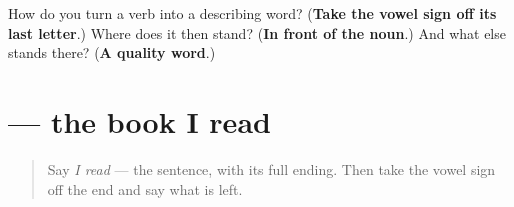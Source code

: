 \begin{tcolorbox}[breakable,colback=teal!4,colframe=teal!35!black,title={Before you move on}]
How do you turn a verb into a describing word? (\textbf{Take the vowel sign off its last letter}.) Where does it then stand? (\textbf{In front of the noun}.) And what else stands there? (\textbf{A quality word}.)
\end{tcolorbox}
\section[\texorpdfstring{\ml{ഞാൻ} \ml{വായിക്കുന്ന} \ml{പുസ്തകം} (ñān vāyikkunna …)}{ഞാൻ വായിക്കുന്ന പുസ്തകം (ñān vāyikkunna …)}]{   — the book I read}

\label{lesson:ML-C90-clause-in-front}



\begin{quote}
Say \emph{I read} — the sentence, with its full ending. Then take the vowel sign off the end and say what is left.
\end{quote}

